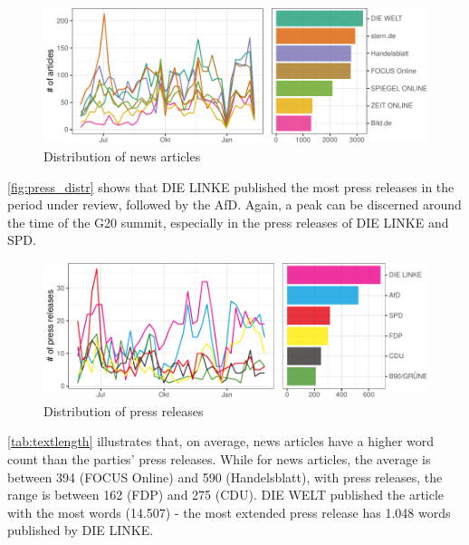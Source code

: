 \documentclass[
  12pt,
]{article}
\begin{document}
\begin{figure}

{\centering \includegraphics[width=0.8\linewidth]{newspaper_files/figure-latex/Distribution of news articles-1} 

}

\caption{Distribution of news articles \label{fig:news_distr}}\label{fig:Distribution of news articles}
\end{figure}

\autoref{fig:press_distr} shows that DIE LINKE published the most press
releases in the period under review, followed by the AfD. Again, a peak
can be discerned around the time of the G20 summit, especially in the
press releases of DIE LINKE and SPD.

\begin{figure}

{\centering \includegraphics[width=0.8\linewidth]{newspaper_files/figure-latex/Distribution of press releases-1} 

}

\caption{Distribution of press releases \label{fig:press_distr}}\label{fig:Distribution of press releases}
\end{figure}

\autoref{tab:textlength} illustrates that, on average, news articles
have a higher word count than the parties' press releases. While for
news articles, the average is between 394 (FOCUS Online) and 590
(Handelsblatt), with press releases, the range is between 162 (FDP) and
275 (CDU). DIE WELT published the article with the most words (14.507) -
the most extended press release has 1.048 words published by DIE LINKE.
\end{document}
